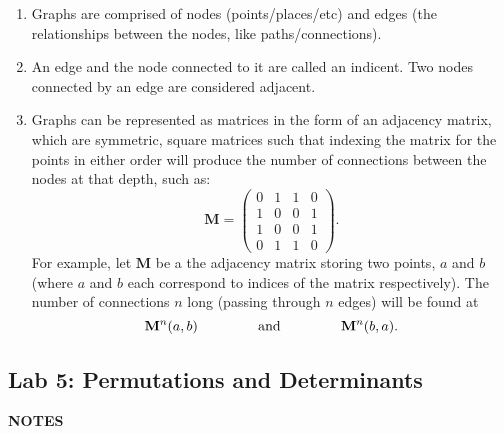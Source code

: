 \documentclass[12pt]{article}
\newcommand{\mat}[1]{\mathbf{#1}}
\newcommand{\notes}{\textbf{NOTES}}
\begin{document}
\begin{enumerate}
\item Graphs are comprised of nodes (points/places/etc) and edges (the relationships between the nodes, like paths/connections).
\item An edge and the node connected to it are called an indicent. Two nodes connected by an edge are considered adjacent.
\item Graphs can be represented as matrices in the form of an adjacency matrix, which are symmetric, square matrices such that indexing the matrix for the points in either order will produce the number of connections between the nodes at that depth, such as:
\begin{equation*}
\mat{M} = \begin{pmatrix}
0 & 1 & 1 & 0 \\
1 & 0 & 0 & 1 \\
1 & 0 & 0 & 1 \\
0 & 1 & 1 & 0
\end{pmatrix}.
\end{equation*}
For example, let $\mat{M}$ be a the adjacency matrix storing two points, $a$ and $b$ (where $a$ and $b$ each correspond to indices of the matrix respectively). The number of connections $n$ long (passing through $n$ edges) will be found at
\begin{equation}
\mat{M}^{n}(a,b) \hspace{0.125\textwidth} \text{and} \hspace{0.125\textwidth} \mat{M}^{n}(b,a).
\end{equation}  
\end{enumerate}

\subsection{Lab 5: Permutations and Determinants}

\notes
\end{document}
